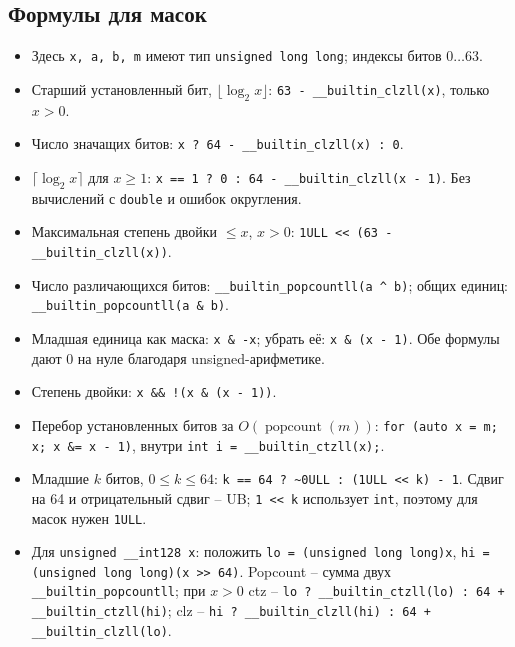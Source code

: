 \subsection{Формулы для масок}
\begin{itemize}[leftmargin=*, nosep]
\item Здесь \verb|x, a, b, m| имеют тип \verb|unsigned long long|; индексы битов $0\ldots63$.
\item Старший установленный бит, $\lfloor\log_2 x\rfloor$: \verb|63 - __builtin_clzll(x)|, только $x>0$.
\item Число значащих битов: \verb|x ? 64 - __builtin_clzll(x) : 0|.
\item $\lceil\log_2 x\rceil$ для $x\ge1$: \verb|x == 1 ? 0 : 64 - __builtin_clzll(x - 1)|. Без вычислений с \verb|double| и ошибок округления.
\item Максимальная степень двойки $\le x$, $x>0$: \verb|1ULL << (63 - __builtin_clzll(x))|.
\item Число различающихся битов: \verb|__builtin_popcountll(a ^ b)|; общих единиц: \verb|__builtin_popcountll(a & b)|.
\item Младшая единица как маска: \verb|x & -x|; убрать её: \verb|x & (x - 1)|. Обе формулы дают 0 на нуле благодаря unsigned-арифметике.
\item Степень двойки: \verb|x && !(x & (x - 1))|.
\item Перебор установленных битов за $O(\operatorname{popcount}(m))$: \verb|for (auto x = m; x; x &= x - 1)|, внутри \verb|int i = __builtin_ctzll(x);|.
\item Младшие $k$ битов, $0\le k\le64$: \verb|k == 64 ? ~0ULL : (1ULL << k) - 1|. Сдвиг на 64 и отрицательный сдвиг -- UB; \verb|1 << k| использует \verb|int|, поэтому для масок нужен \verb|1ULL|.
\item Для \verb|unsigned __int128 x|: положить \verb|lo = (unsigned long long)x|, \verb|hi = (unsigned long long)(x >> 64)|. Popcount -- сумма двух \verb|__builtin_popcountll|; при $x>0$ ctz -- \verb|lo ? __builtin_ctzll(lo) : 64 + __builtin_ctzll(hi)|; clz -- \verb|hi ? __builtin_clzll(hi) : 64 + __builtin_clzll(lo)|.
\end{itemize}

